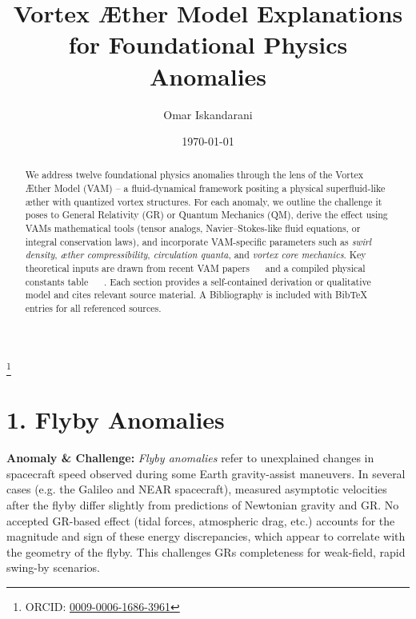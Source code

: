 \documentclass[a4paper, aps,preprint,superscriptaddress, 12pt]{revtex4}
\begin{document}
    \author{Omar Iskandarani}
    \title{Vortex Æther Model Explanations for Foundational Physics Anomalies}
    \date{\today}
    \thanks{ORCID: \href{https://orcid.org/0009-0006-1686-3961}{0009-0006-1686-3961}}


    \begin{abstract}
        We address twelve foundational physics anomalies through the lens of the Vortex Æther Model (VAM) – a fluid-dynamical framework positing a physical superfluid-like æther with quantized vortex structures. For each anomaly, we outline the challenge it poses to General Relativity (GR) or Quantum Mechanics (QM), derive the effect using VAM\rqs s mathematical tools (tensor analogs, Navier–Stokes-like fluid equations, or integral conservation laws), and incorporate VAM-specific parameters such as \textit{swirl density}, \textit{æther compressibility}, \textit{circulation quanta}, and \textit{vortex core mechanics}. Key theoretical inputs are drawn from recent VAM papers~\cite{Iskandarani2025a} ~\cite{Iskandarani2025c}  and a compiled physical constants table~\cite{VAM_constants} ~\cite{Iskandarani2025b} . Each section provides a self-contained derivation or qualitative model and cites relevant source material. A Bibliography is included with BibTeX entries for all referenced sources.

    \end{abstract}

  \maketitle


\section*{1. Flyby Anomalies}

\textbf{Anomaly \& Challenge: } \textit{Flyby anomalies} refer to unexplained changes in spacecraft speed observed during some Earth gravity-assist maneuvers. In several cases (e.g. the Galileo and NEAR spacecraft), measured asymptotic velocities after the flyby differ slightly from predictions of Newtonian gravity and GR. No accepted GR-based effect (tidal forces, atmospheric drag, etc.) accounts for the magnitude and sign of these energy discrepancies, which appear to correlate with the geometry of the flyby. This challenges GR\rqs s completeness for weak-field, rapid swing-by scenarios.
\end{document}
